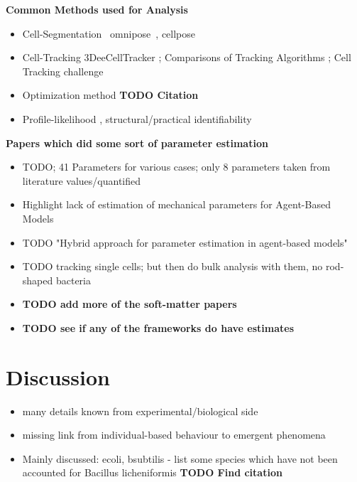 \documentclass{article}
\begin{document}
\textbf{Common Methods used for Analysis}
\begin{itemize}
    \item Cell-Segmentation~\cite{VanValen2016} omnipose~\cite{Cutler2022},
        cellpose~\cite{Stringer2020}
    \item Cell-Tracking 3DeeCellTracker \cite{Wen2021}; Comparisons of Tracking Algorithms
        \cite{Maka2014,Ulman2017}; Cell Tracking challenge \cite{Maka2023}
    \item Optimization method \textbf{TODO Citation}
    \item Profile-likelihood \cite{Kreutz2013}, structural/practical identifiability
        \cite{Heinrich2025}
\end{itemize}

\textbf{Papers which did some sort of parameter estimation}
\begin{itemize}
    \item \cite{Storck2014} TODO; 41 Parameters for various cases; only 8 parameters taken from
        literature values/quantified
    \item Highlight lack of estimation of mechanical parameters for Agent-Based Models
    \item \cite{Gallaher2017} TODO "Hybrid approach for parameter estimation in agent-based models"
    \item \cite{Nguyen2024} TODO tracking single cells; but then do bulk analysis with them, no
        rod-shaped bacteria
    \item \textbf{TODO add more of the soft-matter papers}
    \item \textbf{TODO see if any of the frameworks do have estimates}
\end{itemize}

\section{Discussion}

\begin{itemize}
    \item many details known from experimental/biological side
    \item missing link from individual-based behaviour to emergent phenomena
    \item Mainly discussed: \ac{ecoli}, \ac{bsubtilis} - list some species which have not been
        accounted for Bacillus licheniformis \textbf{TODO Find citation}
\end{itemize}
\end{document}
